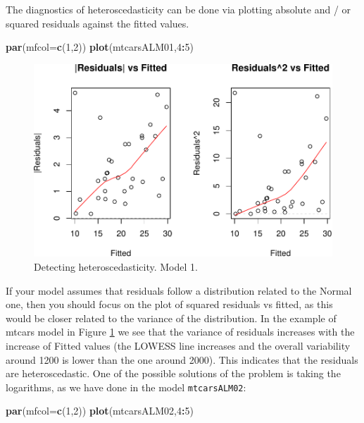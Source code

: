 \documentclass[
]{book}
\newenvironment{Shaded}{\begin{snugshade}}{\end{snugshade}}
\newcommand{\DataTypeTok}[1]{\textcolor[rgb]{0.13,0.29,0.53}{#1}}
\newcommand{\DecValTok}[1]{\textcolor[rgb]{0.00,0.00,0.81}{#1}}
\newcommand{\KeywordTok}[1]{\textcolor[rgb]{0.13,0.29,0.53}{\textbf{#1}}}
\newcommand{\NormalTok}[1]{#1}
\newcommand{\OperatorTok}[1]{\textcolor[rgb]{0.81,0.36,0.00}{\textbf{#1}}}
\theoremstyle{definition}
\theoremstyle{definition}
\theoremstyle{definition}
\theoremstyle{definition}
\theoremstyle{remark}
\begin{document}
The diagnostics of heteroscedasticity can be done via plotting absolute and / or squared residuals against the fitted values.

\begin{Shaded}
\begin{Highlighting}[]
\KeywordTok{par}\NormalTok{(}\DataTypeTok{mfcol=}\KeywordTok{c}\NormalTok{(}\DecValTok{1}\NormalTok{,}\DecValTok{2}\NormalTok{))}
\KeywordTok{plot}\NormalTok{(mtcarsALM01,}\DecValTok{4}\OperatorTok{:}\DecValTok{5}\NormalTok{)}
\end{Highlighting}
\end{Shaded}

\begin{figure}
\centering
\includegraphics{Svetunkov---Statistics-for-Business-Analytics_files/figure-latex/diagnostics10-1.pdf}
\caption{\label{fig:diagnostics10}Detecting heteroscedasticity. Model 1.}
\end{figure}

If your model assumes that residuals follow a distribution related to the Normal one, then you should focus on the plot of squared residuals vs fitted, as this would be closer related to the variance of the distribution. In the example of mtcars model in Figure \ref{fig:diagnostics10} we see that the variance of residuals increases with the increase of Fitted values (the LOWESS line increases and the overall variability around 1200 is lower than the one around 2000). This indicates that the residuals are heteroscedastic. One of the possible solutions of the problem is taking the logarithms, as we have done in the model \texttt{mtcarsALM02}:

\begin{Shaded}
\begin{Highlighting}[]
\KeywordTok{par}\NormalTok{(}\DataTypeTok{mfcol=}\KeywordTok{c}\NormalTok{(}\DecValTok{1}\NormalTok{,}\DecValTok{2}\NormalTok{))}
\KeywordTok{plot}\NormalTok{(mtcarsALM02,}\DecValTok{4}\OperatorTok{:}\DecValTok{5}\NormalTok{)}
\end{Highlighting}
\end{Shaded}
\end{document}

